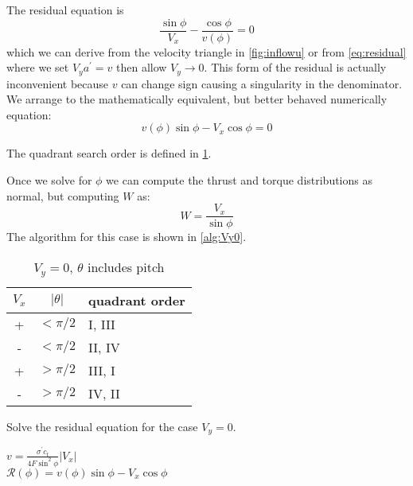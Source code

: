 The residual equation is
\begin{equation}
    \frac{\sin\phi}{V_x} - \frac{\cos\phi}{v(\phi)} = 0
\end{equation}
which we can derive from the velocity triangle in \cref{fig:inflowu} or from \cref{eq:residual} where we set $V_y a^\prime = v$ then allow $V_y \rightarrow 0$.  This form of the residual is actually inconvenient because $v$ can change sign causing a singularity in the denominator.  We arrange to the mathematically equivalent, but better behaved numerically equation:
\begin{equation}
    v(\phi)\sin\phi - V_x \cos\phi = 0
\end{equation}

The quadrant search order is defined in \cref{tab:bracket3}.

Once we solve for $\phi$ we can compute the thrust and torque distributions as normal, but computing $W$ as:
\begin{equation}
    W = \frac{V_x}{\sin\phi}
\end{equation}
The algorithm for this case is shown in \cref{alg:Vy0}.

\begin{table}[htb]
\centering
\caption{$V_y = 0$, $\theta$ includes pitch}
\label{tab:bracket3}
\begin{tabular}{@{}ccl@{}}
\toprule
$V_x$ & $|\theta|$ & quadrant order \\
\midrule
+ & $< \pi/2$ & I, III \\
- & $< \pi/2$ & II, IV \\
+ & $> \pi/2$ & III, I \\
- & $> \pi/2$ & IV, II \\
\bottomrule
\end{tabular}
\end{table}

\begin{algorithm}[htbp]
\caption{Solve the residual equation for the case $V_y = 0$.}
\begin{algorithmic}
\State $v = \frac{\sigma^\prime c_t}{4 F \sin^2\phi} |V_x|$
\\
\State $\mathcal{R}(\phi) = v(\phi)\sin\phi - V_x \cos\phi$

\end{algorithmic}
\label{alg:Vy0}
\end{algorithm}

